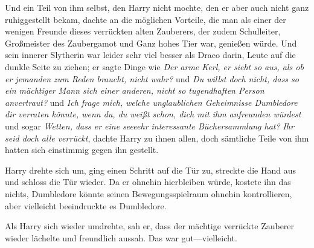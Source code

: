 Und ein Teil von ihm selbst, den Harry nicht mochte, den er aber auch nicht ganz ruhiggestellt bekam, dachte an die möglichen Vorteile, die man als einer der wenigen Freunde dieses verrückten alten Zauberers, der zudem Schulleiter, Großmeister des Zaubergamot und Ganz hohes Tier war, genießen würde. Und sein innerer Slytherin war leider sehr viel besser als Draco darin, Leute auf die dunkle Seite zu ziehen; er sagte Dinge wie \emph{Der arme Kerl, er sieht so aus, als ob er jemanden zum Reden braucht, nicht wahr?} und \emph{Du willst doch nicht, dass so ein mächtiger Mann sich einer anderen, nicht so tugendhaften Person anvertraut?} und \emph{Ich frage mich, welche unglaublichen Geheimnisse Dumbledore dir verraten könnte, wenn du, du weißt schon, dich mit ihm anfreunden würdest} und sogar \emph{Wetten, dass er eine seeeehr interessante Büchersammlung hat?}
\emph{Ihr seid doch alle verrückt}, dachte Harry zu ihnen allen, doch sämtliche Teile von ihm hatten sich einstimmig gegen ihn gestellt.

Harry drehte sich um, ging einen Schritt auf die Tür zu, streckte die Hand aus und schloss die Tür wieder. Da er ohnehin hierbleiben würde, kostete ihn das nichts, Dumbledore könnte seinen Bewegungsspielraum ohnehin kontrollieren, aber vielleicht beeindruckte es Dumbledore.

Als Harry sich wieder umdrehte, sah er, dass der mächtige verrückte Zauberer wieder lächelte und freundlich aussah. Das war gut—vielleicht.

